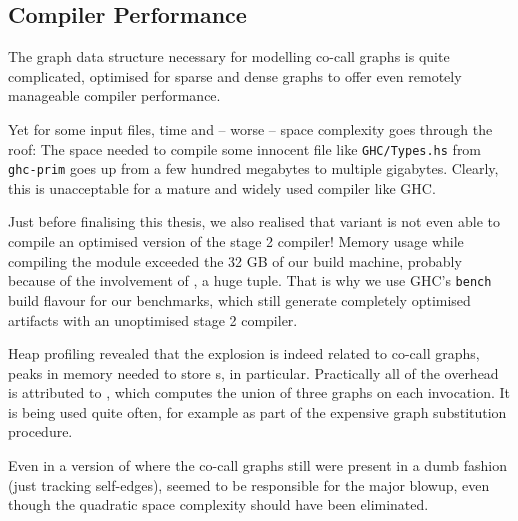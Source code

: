 \subsection{Compiler Performance}\label{sec:compperf}

The graph data structure necessary for modelling co-call graphs is quite complicated, optimised for sparse and dense graphs to offer even remotely manageable compiler performance.

Yet for some input files, time and -- worse -- space complexity goes through the roof:
The space needed to compile some innocent file like \texttt{GHC/Types.hs} from \texttt{ghc-prim} goes up from a few hundred megabytes to multiple gigabytes.
Clearly, this is unacceptable for a mature and widely used compiler like GHC.

Just before finalising this thesis, we also realised that variant \varfull is not even able to compile an optimised version of the stage 2 compiler!
Memory usage while compiling the  module exceeded the 32 GB of our build machine, probably because of the involvement of , a huge tuple.
That is why we use GHC's \texttt{bench} build flavour for our benchmarks, which still generate completely optimised artifacts with an unoptimised stage 2 compiler.

Heap profiling revealed that the explosion is indeed related to co-call graphs, peaks in memory needed to store s, in particular.
Practically all of the overhead is attributed to , which computes the union of three graphs on each invocation. 
It is being used quite often, for example as part of the expensive graph substitution procedure.

Even in a version of \varedges where the co-call graphs still were present in a dumb fashion (\eg just tracking self-edges),  seemed to be responsible for the major blowup, even though the quadratic space complexity should have been eliminated.

